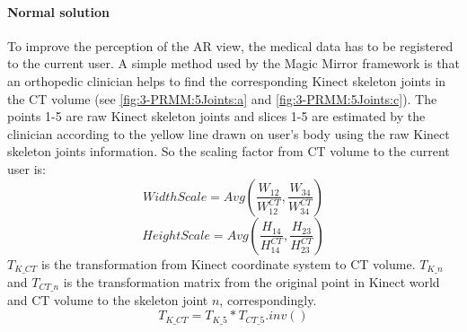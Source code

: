 \paragraph{Normal solution} To improve the perception of the AR view, the medical data has to be registered to the current user. A simple method used by the Magic Mirror framework is that an orthopedic clinician helps to find the corresponding Kinect skeleton joints in the CT volume (see \figurename{\ref{fig:3-PRMM:5Joints:a}} and \figurename{\ref{fig:3-PRMM:5Joints:c}}). The points 1-5 are raw Kinect skeleton joints and slices 1-5 are estimated by the clinician according to the yellow line drawn on user's body using the raw Kinect skeleton joints information. So the scaling factor from CT volume to the current user is:
\begin{equation}
	WidthScale = Avg(\frac{{{W_{12}}}}{{W_{12}^{CT}}},\frac{{{W_{34}}}}{{W_{34}^{CT}}})
\end{equation}
\begin{equation}
	HeightScale = Avg(\frac{{{H_{14}}}}{{H_{14}^{CT}}},\frac{{{H_{23}}}}{{H_{23}^{CT}}})
\end{equation}
$T_{K\_CT}$ is the transformation from Kinect coordinate system to CT volume. $T_{K\_n}$ and $T_{CT\_n}$ is the transformation matrix from the original point in Kinect world and CT volume to the skeleton joint $n$, correspondingly.
\begin{equation}
	T_{K\_CT} = T_{K\_5} * T_{CT\_5}.inv()
\end{equation}
